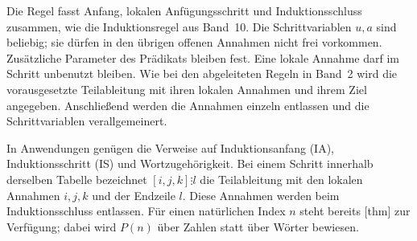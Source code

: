\noindent\begin{minipage}{\linewidth}
\end{minipage}\par
Die Regel fasst Anfang, lokalen Anfügungsschritt und Induktionsschluss
zusammen, wie die Induktionsregel aus Band~10. Die Schrittvariablen
\(u,a\) sind beliebig; sie dürfen in den übrigen offenen Annahmen nicht
frei vorkommen. Zusätzliche Parameter des Prädikats bleiben fest.
Eine lokale Annahme darf im Schritt unbenutzt bleiben.
Wie bei den abgeleiteten Regeln in Band~2 wird die vorausgesetzte
Teilableitung mit ihren lokalen Annahmen und ihrem Ziel angegeben.
Anschließend werden die Annahmen einzeln entlassen und die
Schrittvariablen verallgemeinert.
\begin{tabproofwide}
\end{tabproofwide}

In Anwendungen genügen die Verweise auf Induktionsanfang (IA),
Induktionsschritt (IS) und Wortzugehörigkeit. Bei einem Schritt innerhalb
derselben Tabelle bezeichnet \([i,j,k]\vdots l\) die Teilableitung mit
den lokalen Annahmen \(i,j,k\) und der Endzeile \(l\). Diese Annahmen
werden beim Induktionsschluss entlassen. Für einen natürlichen Index
\(n\) steht bereits [thm] zur
Verfügung; dabei wird \(P(n)\) über Zahlen statt über Wörter bewiesen.
